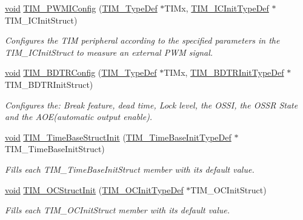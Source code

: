 \begin{DoxyCompactItemize}
\hyperlink{usb__devapi_8h_afabf60e7f57651d6d595a02c75f07cd0}{void} \hyperlink{group___t_i_m___private___functions_gaa71f9296556310f85628d6c748a06475}{T\+I\+M\+\_\+\+P\+W\+M\+I\+Config} (\hyperlink{struct_t_i_m___type_def}{T\+I\+M\+\_\+\+Type\+Def} $\ast$T\+I\+Mx, \hyperlink{struct_t_i_m___i_c_init_type_def}{T\+I\+M\+\_\+\+I\+C\+Init\+Type\+Def} $\ast$T\+I\+M\+\_\+\+I\+C\+Init\+Struct)
\begin{DoxyCompactList}\small\item\em Configures the T\+IM peripheral according to the specified parameters in the T\+I\+M\+\_\+\+I\+C\+Init\+Struct to measure an external P\+WM signal. \end{DoxyCompactList}\item 
\hyperlink{usb__devapi_8h_afabf60e7f57651d6d595a02c75f07cd0}{void} \hyperlink{group___t_i_m___private___functions_ga3df4ba3f0727f63ce621e2b2e6035d4f}{T\+I\+M\+\_\+\+B\+D\+T\+R\+Config} (\hyperlink{struct_t_i_m___type_def}{T\+I\+M\+\_\+\+Type\+Def} $\ast$T\+I\+Mx, \hyperlink{struct_t_i_m___b_d_t_r_init_type_def}{T\+I\+M\+\_\+\+B\+D\+T\+R\+Init\+Type\+Def} $\ast$T\+I\+M\+\_\+\+B\+D\+T\+R\+Init\+Struct)
\begin{DoxyCompactList}\small\item\em Configures the\+: Break feature, dead time, Lock level, the O\+S\+SI, the O\+S\+SR State and the A\+O\+E(automatic output enable). \end{DoxyCompactList}\item 
\hyperlink{usb__devapi_8h_afabf60e7f57651d6d595a02c75f07cd0}{void} \hyperlink{group___t_i_m___private___functions_ga1556a0b9a5d53506875fd7de0cbc6b1f}{T\+I\+M\+\_\+\+Time\+Base\+Struct\+Init} (\hyperlink{struct_t_i_m___time_base_init_type_def}{T\+I\+M\+\_\+\+Time\+Base\+Init\+Type\+Def} $\ast$T\+I\+M\+\_\+\+Time\+Base\+Init\+Struct)
\begin{DoxyCompactList}\small\item\em Fills each T\+I\+M\+\_\+\+Time\+Base\+Init\+Struct member with its default value. \end{DoxyCompactList}\item 
\hyperlink{usb__devapi_8h_afabf60e7f57651d6d595a02c75f07cd0}{void} \hyperlink{group___t_i_m___private___functions_ga394683c78ae02837882e36014e11643e}{T\+I\+M\+\_\+\+O\+C\+Struct\+Init} (\hyperlink{struct_t_i_m___o_c_init_type_def}{T\+I\+M\+\_\+\+O\+C\+Init\+Type\+Def} $\ast$T\+I\+M\+\_\+\+O\+C\+Init\+Struct)
\begin{DoxyCompactList}\small\item\em Fills each T\+I\+M\+\_\+\+O\+C\+Init\+Struct member with its default value. \end{DoxyCompactList}\item 

\end{DoxyCompactItemize}
